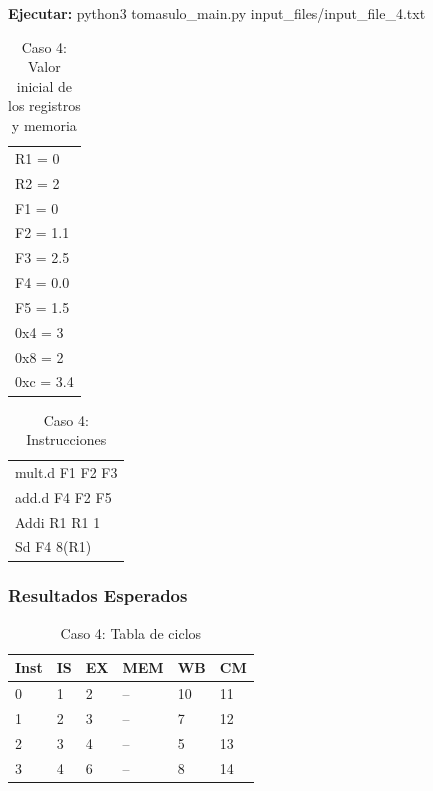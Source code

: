 \documentclass[a4paper]{article}
\begin{document}
	\textbf{Ejecutar:} python3 tomasulo\_main.py input\_files/input\_file\_4.txt

	\begin{table}[H]
		\centering
		\caption*{Caso 4: Valor inicial de los registros y memoria}
		\begin{tabular}{l}
			R1 = 0 \\
			R2 = 2 \\
			F1 = 0  \\
			F2 = 1.1 \\
			F3 = 2.5 \\
			F4 = 0.0 \\
			F5 = 1.5 \\
			0x4 = 3 \\
			0x8 = 2 \\
			0xc = 3.4 \\
		\end{tabular}
	\end{table}

	\begin{table}[H]
		\centering
		\caption*{Caso 4: Instrucciones}
		\begin{tabular}{l}
			mult.d F1 F2 F3 \\
			add.d F4 F2 F5 \\
			Addi R1 R1 1 \\
			Sd F4 8(R1)
		\end{tabular}
	\end{table}

	\subsubsection*{Resultados Esperados}

	\begin{table}[H]
		\centering
		\caption*{Caso 4: Tabla de ciclos}
		\begin{tabular}{|l|l|l|l|l|l|}
			\hline
			\textbf{Inst} & \textbf{IS} & \textbf{EX} & \textbf{MEM} & \textbf{WB} & \textbf{CM} \\ \hline
			0             & 1           & 2           & --           & 10          & 11          \\ \hline
			1             & 2           & 3           & --           & 7           & 12          \\ \hline
			2             & 3           & 4           & --           & 5           & 13          \\ \hline
			3             & 4           & 6           & --           & 8           & 14          \\ \hline
			\end{tabular}
	\end{table}
\end{document}
